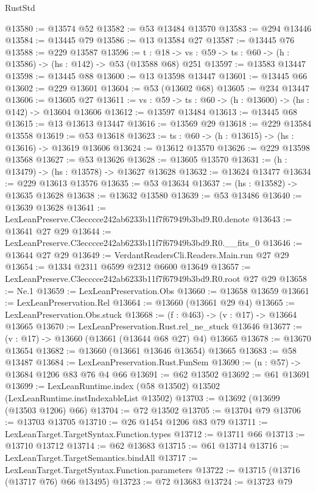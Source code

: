 \begin{lexlean}{RustStd}
\begin{coremodule}
@13580 := @13574 @52
@13582 := @53 @13484 @13570
@13583 := @294 @13446
@13584 := @13445 @79
@13586 := @13 @13584 @27
@13587 := @13445 @76
@13588 := @229 @13587
@13596 := {t : @18} ->
  {vs : @59} -> {ts : @60} -> (h : @13586) -> (hs : @142) -> @53 (@13588 @68) @251
@13597 := @13583 @13447
@13598 := @13445 @88
@13600 := @13 @13598 @13447
@13601 := @13445 @66
@13602 := @229 @13601
@13604 := @53 (@13602 @68)
@13605 := @234 @13447
@13606 := @13605 @27
@13611 := {vs : @59} -> {ts : @60} -> (h : @13600) -> (hs : @142) -> @13604 @13606
@13612 := @13597 @13484
@13613 := @13445 @68
@13615 := @13 @13613 @13447
@13616 := @13569 @29
@13618 := @229 @13584 @13558
@13619 := @53 @13618
@13623 := {ts : @60} -> (h : @13615) -> (hs : @13616) -> @13619 @13606
@13624 := @13612 @13570
@13626 := @229 @13598 @13568
@13627 := @53 @13626
@13628 := @13605 @13570
@13631 := (h : @13479) -> (hs : @13578) -> @13627 @13628
@13632 := @13624 @13477
@13634 := @229 @13613 @13576
@13635 := @53 @13634
@13637 := (hs : @13582) -> @13635 @13628
@13638 := @13632 @13580
@13639 := @53 @13486
@13640 := @13639 @13628
@13641 := LexLeanPreserve.C3ecccce242ab6233b11f7f67949b3bd9.R0.denote
@13643 := @13641 @27 @29
@13644 := LexLeanPreserve.C3ecccce242ab6233b11f7f67949b3bd9.R0.__fits_0
@13646 := @13644 @27 @29
@13649 := VerdantReadersCli.Readers.Main.run @27 @29
@13654 := @1334 @2311 @6599 @2312 @6600 @13649
@13657 := LexLeanPreserve.C3ecccce242ab6233b11f7f67949b3bd9.R0.root @27 @29
@13658 := Ne.{1}
@13659 := LexLeanPreservation.Obs
@13660 := @13658 @13659
@13661 := LexLeanPreservation.Rel
@13664 := @13660 (@13661 @29 @4)
@13665 := LexLeanPreservation.Obs.stuck
@13668 := (f : @463) -> (v : @17) -> @13664 @13665
@13670 := LexLeanPreservation.Rust.rel_ne_stuck @13646
@13677 := (v : @17) -> @13660 (@13661 (@13644 @68 @27) @4) @13665
@13678 := @13670 @13654
@13682 := @13660 (@13661 @13646 @13654) @13665
@13683 := @58 @13487
@13684 := LexLeanPreservation.Rust.FunSem
@13690 := (n : @57) -> @13684 @1206 @83 @76 @4 @66
@13691 := @62 @13502
@13692 := @61 @13691
@13699 := LexLeanRuntime.index (@58 @13502) @13502 (LexLeanRuntime.instIndexableList @13502)
@13703 := @13692 (@13699 (@13503 @1206) @66)
@13704 := @72 @13502
@13705 := @13704 @79
@13706 := @13703 @13705
@13710 := @26 @1454 @1206 @83 @79
@13711 := LexLeanTarget.TargetSyntax.Function.types
@13712 := @13711 @66
@13713 := @13710 @13712
@13714 := @62 @13683
@13715 := @61 @13714
@13716 := LexLeanTarget.TargetSemantics.bindAll
@13717 := LexLeanTarget.TargetSyntax.Function.parameters
@13722 := @13715 (@13716 (@13717 @76) @66 @13495)
@13723 := @72 @13683
@13724 := @13723 @79

\end{coremodule}
\end{lexlean}
